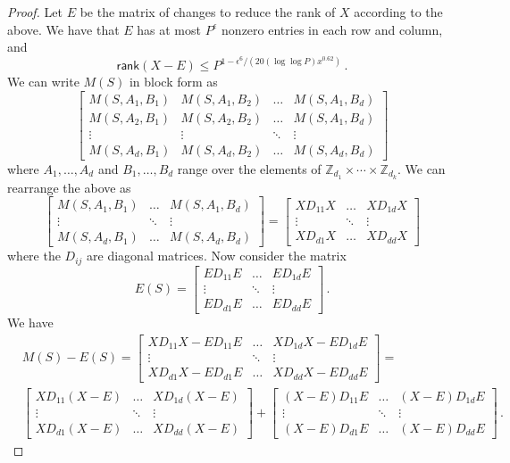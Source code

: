 \documentclass{toc}
\renewcommand\Z{{\mathbb{Z}}}
\newcommand\rank{\textsf{rank}}
\begin{document}
\begin{proof}
Let $E$ be the matrix of changes to reduce the rank of $X$ according to the above.  We have that $E$ has at most $P^{\epsilon}$ nonzero entries in each row and column, and  
\[
\rank(X - E) \leq P^{1 - \epsilon^6/(20(\log \log P) x^{0.62})} \,.
\]
We can write $M(S)$ in block form as 
\[
\begin{bmatrix}
M(S,A_1,B_1) &  M(S,A_1, B_2) &  \dots & M(S, A_1, B_d)\\
M(S, A_2, B_1) & M(S, A_2, B_2) & \dots &  M(S, A_1, B_d)\\
\vdots & \vdots & \ddots & \vdots \\
M(S, A_d, B_1) & M(S, A_d, B_2) & \dots & M(S, A_d, B_d)
\end{bmatrix}
\]
where $A_1, \dots , A_d$ and $B_1, \dots , B_d$ range over the elements of $\Z_{d_1} \times \cdots \times \Z_{d_k}$.  We can rearrange the above as 
\[
\begin{bmatrix}
M(S,A_1,B_1) &  \dots & M(S, A_1, B_d)\\
\vdots  & \ddots & \vdots \\
M(S, A_d, B_1)  & \dots & M(S, A_d, B_d)
\end{bmatrix} = 
\begin{bmatrix}
XD_{11}X &  \dots & XD_{1d}X\\
\vdots  & \ddots & \vdots \\
XD_{d1}X  & \dots & XD_{dd}X
\end{bmatrix}
\]
where the $D_{ij}$ are diagonal matrices.  Now consider the matrix
\[
E(S) = 
\begin{bmatrix}
 ED_{11}E &  \dots & ED_{1d}E\\
\vdots  & \ddots & \vdots \\
ED_{d1}E  & \dots & ED_{dd}E
\end{bmatrix} \,.
\]
We have
\begin{align*}
&M(S) - E(S) = 
\begin{bmatrix}
XD_{11}X - ED_{11}E &  \dots & XD_{1d}X - ED_{1d}E\\
\vdots  & \ddots & \vdots \\
XD_{d1}X - ED_{d1}E  & \dots & XD_{dd}X - ED_{dd}E
\end{bmatrix}
= \\
&\begin{bmatrix}
XD_{11}(X - E)  &  \dots & XD_{1d}(X - E) \\
\vdots  & \ddots & \vdots \\
XD_{d1}(X - E)    & \dots & XD_{dd}(X - E)  
\end{bmatrix}  + 
\begin{bmatrix}
 (X-E)D_{11}E & \dots &  (X-E)D_{1d}E \\
 \vdots  & \ddots & \vdots  \\
 (X-E)D_{d1}E & \dots & (X-E)D_{dd}E
\end{bmatrix} \,.
\end{align*}


\end{proof}
\end{document}
